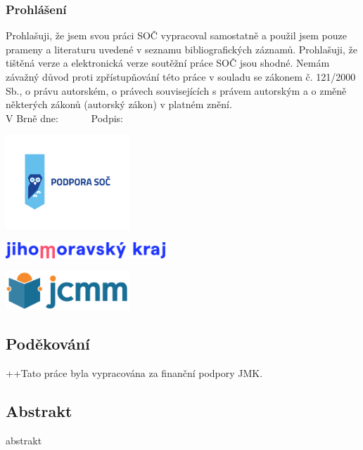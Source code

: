 \documentclass [12pt]{report}
\begin{document}
\newpage
\thispagestyle{empty}
\vspace*{14cm}
\subsubsection*{Prohlášení}

Prohlašuji, že jsem svou práci SOČ vypracoval samostatně a použil jsem pouze prameny a literaturu uvedené v seznamu bibliografických záznamů.
Prohlašuji, že tištěná verze a elektronická verze soutěžní práce SOČ jsou shodné. 
Nemám závažný důvod proti zpřístupňování této práce v souladu se zákonem č. 121/2000 Sb., o právu autorském, o právech souvisejících s právem autorským a o změně některých zákonů (autorský zákon) v platném znění. \\[1cm]
V Brně dne: \dotfill \ \ \ \ \ \  Podpis: \dotfill

\newpage
\thispagestyle{empty}
\begin{center}
\includegraphics[width=0.35\textwidth]{podpora_soc-horizontalni.png}
\end{center}
\begin{center}
\includegraphics[width=0.45\textwidth]{logo_JMK_pruhledne.png}
\end{center}
\vspace*{0.7cm}
\begin{center}
\includegraphics[width=0.35\textwidth]{jcmm-logotype-positive1.png}
\end{center}
\vspace*{9.5cm}
\subsection*{Poděkování}
++Tato práce byla vypracována za finanční podpory JMK.


\newpage
\thispagestyle{empty}
\subsection*{Abstrakt}
abstrakt
\end{document}
